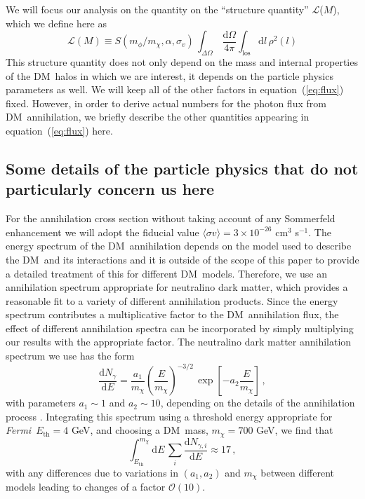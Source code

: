 \documentclass[aps,prd,twocolumn,amsmath,amssymb,floatfix,nofootinbib,10pt]{revtex4}
\newcommand{\Fermi}{\emph{Fermi}}
\newcommand{\DM}{DM}
\newcommand{\somm}{\ensuremath{S}}
\newcommand{\mdm}{\ensuremath{m_{\chi}}}
\newcommand{\mv}{\ensuremath{m_{\phi}}}
\newcommand{\dd}{\mathrm{d}}
\newcommand{\eqnname}{equation}
\newcommand{\Ngamma}{\ensuremath{N_{\gamma}}}
\newcommand{\Ngammai}{\ensuremath{N_{\gamma,i}}}
\newcommand{\Eth}{\ensuremath{E_{\mathrm{th}}}}
\newcommand{\sigmaannv}{\ensuremath{\langle\sigma v\rangle}}
\newcommand{\los}{los}
\newcommand{\order}{\ensuremath{\mathcal{O}}}
\newcommand{\sigv}{\ensuremath{\sigma_v}}
\newcommand{\lum}{\ensuremath{\mathcal{L}}}
\begin{document}
We will focus our analysis on the quantity on the ``structure quantity''
\lum($M$), which we define here as
\begin{equation}\label{eq:structquant}
\lum(M)\equiv\somm\left(\mv/\mdm,\alpha,\sigv\right)\,\int_{\Delta\Omega}\,\frac{\dd\Omega}{4\pi}\int_{\mathrm{\los}}
\dd l\, \rho^2(l)
\end{equation}
This structure quantity does not only depend on the mass and internal
properties of the \DM\ halos in which we are interest, it depends on
the particle physics parameters as well. We will keep all of the other
factors in \eqnname\ (\ref{eq:flux}) fixed. However, in order to
derive actual numbers for the photon flux from \DM\ annihilation, we
briefly describe the other quantities appearing in \eqnname\
(\ref{eq:flux}) here.

\subsection{Some details of the particle physics that do not particularly concern us here}


For the annihilation cross section without taking account of any
Sommerfeld enhancement we will adopt the fiducial value $\sigmaannv =
3 \times 10^{-26} $ cm$^3$ s$^{-1}$. The energy spectrum of the \DM\
annihilation depends on the model used to describe the \DM\ and its
interactions and it is outside of the scope of this paper to provide a
detailed treatment of this for different \DM\ models. Therefore, we
use an annihilation spectrum appropriate for neutralino dark matter,
which provides a reasonable fit to a variety of different annihilation
products. Since the energy spectrum contributes a multiplicative
factor to the \DM\ annihilation flux, the effect of different
annihilation spectra can be incorporated by simply multiplying our
results with the appropriate factor. The neutralino dark matter
annihilation spectrum we use has the form
\cite{1998APh.....9..137B,2004PhRvD..70j3529F}
\begin{equation}\label{eq:annspectrum}
\frac{\dd \Ngamma}{\dd E} = \frac{a_1}{\mdm} \left(\frac{E}{\mdm}\right)^{-3/2}\, \exp\left[-a_2\frac{E}{\mdm}\right]\, ,
\end{equation}
with parameters $a_1\sim 1$ and $a_2 \sim 10$, depending on the
details of the annihilation process
\cite{2004PhRvD..70j3529F}. Integrating this spectrum using a
threshold energy appropriate for \Fermi\, $\Eth = 4$ GeV, and choosing
a \DM\ mass, $\mdm = 700$ GeV, we find that
\begin{equation}
\int_{\Eth}^{\mdm}\dd E\, \sum_i \frac{\dd
\Ngammai}{\dd E} \approx 17\, ,
\end{equation}
with any differences due to variations in $(a_1,a_2)$ and $\mdm$
between different models leading to changes of a factor $\order(10)$. 
\end{document}
